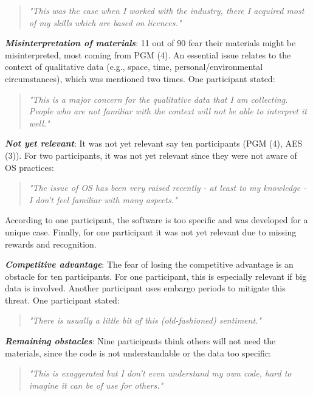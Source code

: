 \documentclass[gc, manuscript]{copernicus}
\begin{document}
\begin{quote}
\textit{"This was the case when I worked with the industry, there I acquired most of my skills which are based on licences."}
\end{quote}

\textit{\textbf{Misinterpretation of materials}}: 11 out of 90 fear
their materials might be misinterpreted, most coming from PGM (4). An
essential issue relates to the context of qualitative data (e.g., space,
time, personal/environmental circumstances), which was mentioned two
times. One participant stated:

\begin{quote}
\textit{"This is a major concern for the qualitative data that I am collecting. People who are not familiar with the context will not be able to interpret it well."}
\end{quote}

\textit{\textbf{Not yet relevant}}: It was not yet relevant say ten
participants (PGM (4), AES (3)). For two participants, it was not yet
relevant since they were not aware of OS practices:

\begin{quote}
\textit{"The issue of OS has been very raised recently - at least to my knowledge - I don't feel familiar with many aspects."}
\end{quote}

According to one participant, the software is too specific and was
developed for a unique case. Finally, for one participant it was not yet
relevant due to missing rewards and recognition.

\textit{\textbf{Competitive advantage}}: The fear of losing the
competitive advantage is an obstacle for ten participants. For one
participant, this is especially relevant if big data is involved.
Another participant uses embargo periods to mitigate this threat. One
participant stated:

\begin{quote}
\textit{"There is usually a little bit of this (old-fashioned) sentiment."}
\end{quote}

\textit{\textbf{Remaining obstacles}}: Nine participants think others
will not need the materials, since the code is not understandable or the
data too specific:

\begin{quote}
\textit{"This is exaggerated but I don't even understand my own code, hard to imagine it can be of use for others."}
\end{quote}
\end{document}
